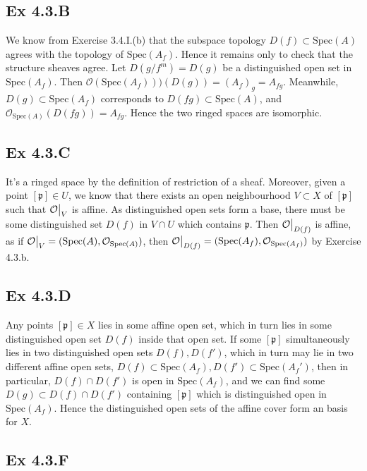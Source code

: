 \documentclass{article}
\newcommand\restr[2]{{%
  \left.\kern-\nulldelimiterspace %
  #1 %
  \vphantom{\big|} %
  \right|_{#2} %
  }}
\theoremstyle{definition}
\newcommand{\Spec}{\text{Spec}}
\begin{document}
\subsection*{Ex 4.3.B}

We know from Exercise 3.4.I.(b) that the subspace topology $D(f) \subset
\Spec(A)$ agrees with the topology of $\Spec(A_f)$. Hence it remains only to
check that the structure sheaves agree. Let $D(g/f^m) = D(g)$ be a
distinguished open set in $\Spec(A_f)$. Then $\mathcal{O}(\Spec(A_f)))(D(g)) =
(A_f)_{g} = A_{fg}$. Meanwhile, $D(g)  \subset \Spec(A_f)$ corresponds to
$D(fg) \subset \Spec(A)$, and $\mathcal{O}_{\Spec(A)}(D(fg)) = A_{fg}$. Hence
the two ringed spaces are isomorphic.

\subsection*{Ex 4.3.C}

It's a ringed space by the definition of restriction of a sheaf. Moreover,
given a point $[\mathfrak{p}] \in U$, we know that there exists an open
neighbourhood $V \subset X$ of $[\mathfrak{p}]$ such that
$\restr{\mathcal{O}}{V}$ is affine. As distinguished open sets form a base,
there must be some distinguished set $D(f)$ in $V \cap U$ which contains
$\mathfrak{p}$. Then $\restr{\mathcal{O}}{D(f)}$ is affine, as if
$\restr{\mathcal{O}}{V} = (\Spec(A), \mathcal{O}_{\Spec(A)})$, then
$\restr{\mathcal{O}}{D(f)} = (\Spec(A_f), \mathcal{O}_{\Spec(A_f)})$ by
Exercise 4.3.b.

\subsection*{Ex 4.3.D}

Any points $[\mathfrak{p}] \in X$ lies in some affine open set, which in turn
lies in some distinguished open set $D(f)$ inside that open set. If some
$[\mathfrak{p}]$ simultaneously lies in two distinguished open sets $D(f),
D(f')$, which in turn may lie in two different affine open sets, $D(f) \subset
\Spec(A_f), D(f') \subset \Spec(A_f')$, then in particular, $D(f) \cap D(f')$
is open in $\Spec(A_f)$, and we can find some $D(g) \subset D(f) \cap D(f')$
containing $[\mathfrak{p}]$ which is distinguished open in $\Spec(A_f)$. Hence
the distinguished open sets of the affine cover form an basis for $X$.

\subsection*{Ex 4.3.F}
\end{document}
